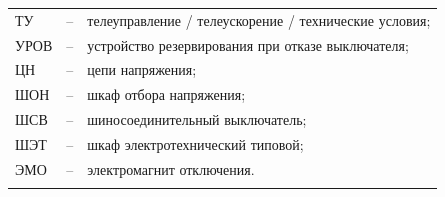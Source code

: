 \begin{longtable}{>{\raggedright\arraybackslash}m{2cm}>{\raggedright\arraybackslash}m{0.5cm}>{\raggedright\arraybackslash}m{20cm}}
ТУ & -- & телеуправление / телеускорение / технические условия; \\
УРОВ & -- & устройство резервирования при отказе выключателя; \\
ЦН & -- & цепи напряжения; \\
ШОН & -- & шкаф отбора напряжения; \\
ШСВ & -- & шиносоединительный выключатель; \\
ШЭТ & -- & шкаф электротехнический типовой; \\
ЭМО & -- & электромагнит отключения. \\
{\color{white}\fontsize{0.1pt}{0.1pt}\selectfont<endABBRS>}
\end{longtable}
